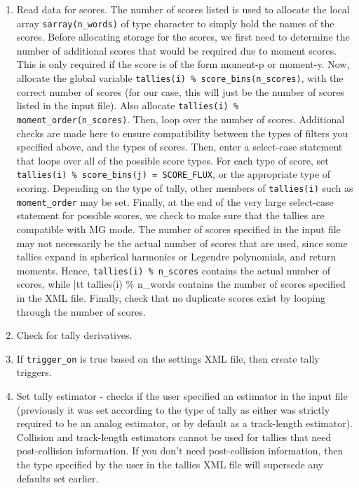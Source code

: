 \documentclass[10pt]{article}
\numberwithin{equation}{section} %
\begin{document}
\begin{enumerate}
\begin{enumerate}
\begin{enumerate}
		\item Read data for scores. The number of scores listed is used to allocate the local array {\tt sarray(n\_words)} of type character to simply hold the names of the scores. Before allocating storage for the scores, we first need to determine the number of additional scores that would be required due to moment scores. This is only required if the score is of the form moment-p or moment-y. Now, allocate the global variable {\tt tallies(i) \% score\_bins(n\_scores)}, with the correct number of scores (for our case, this will just be the number of scores listed in the input file). Also allocate {\tt tallies(i) \% moment\_order(n\_scores)}. Then, loop over the number of scores. Additional checks are made here to ensure compatibility between the types of filters you specified above, and the types of scores. Then, enter a select-case statement that loops over all of the possible score types. For each type of score, set {\tt tallies(i) \% score\_bins(j) = SCORE\_FLUX}, or the appropriate type of scoring. Depending on the type of tally, other members of {\tt tallies(i)} such as {\tt moment\_order} may be set. Finally, at the end of the very large select-case statement for possible scores, we check to make sure that the tallies are compatible with MG mode. The number of scores specified in the input file may not necessarily be the actual number of scores that are used, since some tallies expand in spherical harmonics or Legendre polynomials, and return moments. Hence, {\tt tallies(i) \% n\_scores} contains the actual number of scores, while {|tt tallies(i) \% n\_words} contains the number of scores specified in the XML file. Finally, check that no duplicate scores exist by looping through the number of scores.
		\item Check for tally derivatives. 
		\item If {\tt trigger\_on} is true based on the settings XML file, then create tally triggers.
		\item Set tally estimator - checks if the user specified an estimator in the input file (previously it was set according to the type of tally as either was strictly required to be an analog estimator, or by default as a track-length estimator). Collision and track-length estimators cannot be used for tallies that need post-collision information. If you don't need post-collision information, then the type specified by the user in the tallies XML file will supersede any defaults set earlier. 
		\end{enumerate}
	\end{enumerate}
\end{enumerate}
\end{document}

